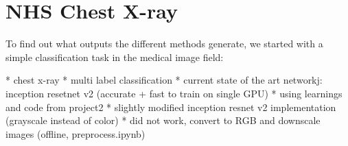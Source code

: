 \chapter{NHS Chest X-ray}
To find out what outputs the different methods generate, we started with a simple classification task in the medical image field:

* chest x-ray
* multi label classification
* current state of the art networkj: inception  resetnet v2 (accurate + fast to train on single GPU)
* using learnings and code from project2
* slightly modified inception resnet v2 implementation (grayscale instead of color)
* did not work, convert to RGB and downscale images (offline, preprocess.ipynb)
